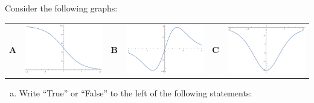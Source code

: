 \documentclass[notes]{subfiles}
\begin{document}
		\begin{ex}
			Consider the following graphs:
				\begin{center}
					{\renewcommand{\arraystretch}{1.2}
					\begin{tabular}{cccccc}
						\textbf{A} & \includegraphics[scale=.3]{./img/44-1.png} & \textbf{B} &\includegraphics[scale=.3]{./img/44-3.png}&\textbf{C}&\includegraphics[scale=.3]{./img/44-2.png}
					\end{tabular}
					}
				\end{center}
				\begin{enumerate}[(a)]
					\item Write ``True'' or ``False'' to the left of the following statements:
						\begin{center}
							\begin{tabular}{ll}

\end{tabular}
\end{center}
\end{enumerate}
\end{ex}
\end{document}
